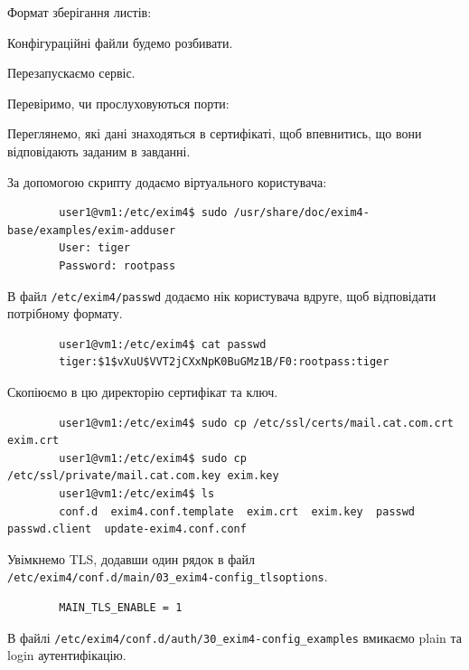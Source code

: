 \documentclass[14pt, a4paper]{extreport}
\begin{document}
	Формат зберігання листів:
	
	
	Конфігураційні файли будемо розбивати.
	
	
	Перезапускаємо сервіс. 
	
	
	Перевіримо, чи прослуховуються порти:
	
	
	Переглянемо, які дані знаходяться в сертифікаті, щоб впевнитись, що вони відповідають заданим в завданні.
	
	
	За допомогою скрипту додаємо віртуального користувача:
	
	\begin{verbatim}
		user1@vm1:/etc/exim4$ sudo /usr/share/doc/exim4-base/examples/exim-adduser
		User: tiger
		Password: rootpass
	\end{verbatim}

	В файл \texttt{/etc/exim4/passwd} додаємо нік користувача вдруге, щоб відповідати потрібному формату.
	
	\begin{verbatim}
		user1@vm1:/etc/exim4$ cat passwd
		tiger:$1$vXuU$VVT2jCXxNpK0BuGMz1B/F0:rootpass:tiger
	\end{verbatim}
	
	Скопіюємо в цю директорію сертифікат та ключ.
	
	\begin{verbatim}
		user1@vm1:/etc/exim4$ sudo cp /etc/ssl/certs/mail.cat.com.crt exim.crt
		user1@vm1:/etc/exim4$ sudo cp /etc/ssl/private/mail.cat.com.key exim.key
		user1@vm1:/etc/exim4$ ls
		conf.d  exim4.conf.template  exim.crt  exim.key  passwd  passwd.client  update-exim4.conf.conf
	\end{verbatim}
	
	Увімкнемо TLS, додавши один рядок в файл \texttt{/etc/exim4/conf.d/main/03\_exim4-config\_tlsoptions}.
	
	\begin{verbatim}
		MAIN_TLS_ENABLE = 1
	\end{verbatim}
	
	В файлі \texttt{/etc/exim4/conf.d/auth/30\_exim4-config\_examples} вмикаємо plain та login аутентифікацію.
	
	
\end{document}
